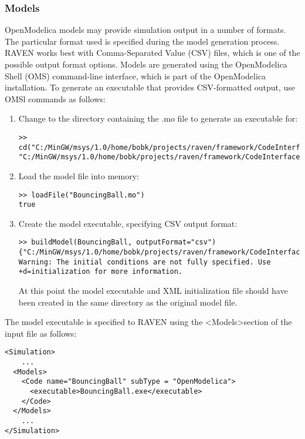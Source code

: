 \subsubsection{Models}
OpenModelica models may provide simulation output in a number of formats.  The particular format used is specified during the model generation
process.  RAVEN works best with Comma-Separated Value (CSV) files, which is one of the possible output format options.  Models are generated 
using the OpenModelica Shell (OMS) command-line interface, which is part of the OpenModelica installation.  To generate an executable that provides 
CSV-formatted output, use OMSl commands as follows:
 \begin{enumerate}
\item Change to the directory containing the .mo file to generate an executable for:
\begin{lstlisting}
>> cd("C:/MinGW/msys/1.0/home/bobk/projects/raven/framework/CodeInterfaces/OpenModelica")
"C:/MinGW/msys/1.0/home/bobk/projects/raven/framework/CodeInterfaces/OpenModelica"
\end{lstlisting}
\item Load the model file into memory:
\begin{lstlisting}
>> loadFile("BouncingBall.mo")
true
\end{lstlisting}
\item Create the model executable, specifying CSV output format:
\begin{lstlisting}
>> buildModel(BouncingBall, outputFormat="csv")
{"C:/MinGW/msys/1.0/home/bobk/projects/raven/framework/CodeInterfaces/OpenModelica/BouncingBall","BouncingBall_init.xml"}
Warning: The initial conditions are not fully specified. Use +d=initialization for more information.
\end{lstlisting}
At this point the model executable and XML initialization file should have been created in the same directory as the original model file.
\end{enumerate}
The model executable is specified to RAVEN using the \textless Models\textgreater  section of the input file as follows:
\begin{lstlisting}[style=XML]
<Simulation>
    ...
  <Models>
    <Code name="BouncingBall" subType = "OpenModelica">
      <executable>BouncingBall.exe</executable>
    </Code>
  </Models>
    ...
</Simulation>
\end{lstlisting}
